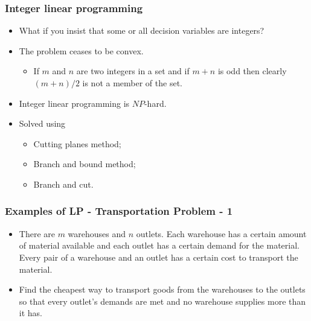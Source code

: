 \documentclass{beamer}
\begin{document}
\begin{frame}
\frametitle{Integer linear programming}
\begin{itemize}
\item What if you insist that some or all decision variables are integers?
\item The problem ceases to be convex. 
\begin{itemize}
\item If $m$ and $n$ are two integers in a set and if $m + n$ is odd then
clearly $(m + n)/2$ is not a member of the set.
\end{itemize}
\item Integer linear programming is $NP$-hard.
\item Solved using 
\begin{itemize}
\item Cutting planes method;
\item Branch and bound method;
\item Branch and cut.
\end{itemize}
\end{itemize}
\end{frame}

\begin{frame}
\frametitle{Examples of LP - Transportation Problem - 1}
\begin{itemize}
\item There are $m$ warehouses and $n$ outlets. Each warehouse has a certain 
amount of material available and each outlet has a certain demand for the 
material. Every pair of a warehouse and an outlet has a certain cost to 
transport the material.

\item Find the cheapest way to transport goods from the warehouses to the outlets
so that every outlet's demands are met and no warehouse supplies more than
it has.
\end{itemize}

\end{frame}
\end{document}
